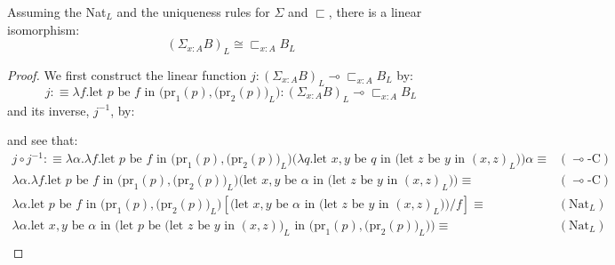 \begin{thm}\label{L-subset}
  Assuming the Nat$_L$ and the uniqueness rules for $\Sigma$ and $\sqsubset$, there is a linear isomorphism:
  \[
    (\Sigma_{x :A}B)_L \cong \sqsubset_{x:A}B_L
  \]
  \begin{proof} 
We first construct the linear function $j : (\Sigma_{x :A}B)_L \multimap \sqsubset_{x:A}B_L$ by:\\
\[
  j :\equiv \lambda f. \text{let $p$ be $f$ in $\Big (\text{pr}_1(p), \big  (\text{pr}_2(p)\big )_L\Big)$} : (\Sigma_{x :A}B)_L \multimap \sqsubset_{x :A}B_L
\]
and its inverse, $j^{-1}$, by:
\begin{prooftree}
\end{prooftree}
and see that:
\[
  \begin{split}
    j \circ j^{-1} : \equiv \lambda \alpha. \lambda f. \text{let $p$ be $f$ in $\Big (\text{pr}_1(p), \big  (\text{pr}_2(p)\big )_L\Big)$} \big (\lambda q. \text{let $x, y$ be $q$ in (let $z$ be $y$ in $(x, z)_L$)} \big ) \alpha \equiv& \quad (\text{$\multimap$-C})\\
    \lambda \alpha. \lambda f. \text{let $p$ be $f$ in $\Big (\text{pr}_1(p), \big  (\text{pr}_2(p)\big )_L\Big)$} \big (\text{let $x, y$ be $\alpha$ in (let $z$ be $y$ in $(x, z)_L$)} \big ) \equiv& \quad (\text{$\multimap$-C})\\
        \lambda \alpha. \text{let $p$ be $f$ in $\Big (\text{pr}_1(p), \big  (\text{pr}_2(p)\big )_L\Big)$} [\big (\text{let $x, y$ be $\alpha$ in (let $z$ be $y$ in $(x, z)_L$)} \big )/f] \equiv& \quad (\text{Nat}_L)\\
    \lambda \alpha. \text{let $x, y$ be $\alpha$ in $\Big ($let $p$ be (let $z$ be $y$ in $(x, z))_L$ in $\Big (\text{pr}_1(p), \big  (\text{pr}_2(p)\big )_L\Big) \Big )$}  \equiv&\quad (\text{Nat}_L)\\

\end{split}\]
\end{proof}
\end{thm}
